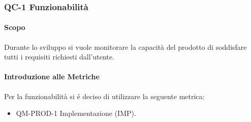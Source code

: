 



	\subsubsection{QC-1 Funzionabilità}
		\paragraph{Scopo}
			Durante lo sviluppo si vuole monitorare la capacità del prodotto di soddisfare tutti i requisiti richiesti dall'utente.
		\paragraph{Introduzione alle Metriche}
			Per la funzionabilità si é deciso di utilizzare la seguente metrica:
			\begin{itemize}
				\item QM-PROD-1 Implementazione (IMP).
			\end{itemize}

